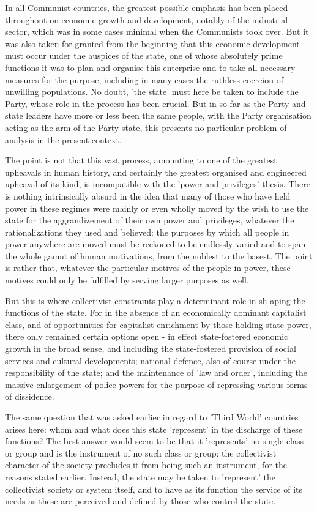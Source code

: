 In all Communist countries, the greatest possible emphasis has been placed throughout on economic growth and development, notably of the industrial sector, which was in some cases minimal when the Communists took over. But it was also taken for granted from the beginning that this economic development must occur under the auspices of the state, one of whose absolutely prime functions it was to plan and organise this enterprise and to take all necessary measures for the purpose, including in many cases the ruthless coercion of unwilling populations. No doubt, 'the state' must here be taken to include the Party, whose role in the process has been crucial. But in so far as the Party and state leaders have more or less been the same people, with the Party organisation acting as the arm of the Party-state, this presents no particular problem of analysis in the present context.

The point is not that this vast process, amounting to one of the greatest upheavals in human history, and certainly the greatest organised and engineered upheaval of its kind, is incompatible with the 'power and privileges' thesis. There is nothing intrinsically absurd in the idea that many of those who have held power in these regimes were mainly or even wholly moved by the wish to use the state for the aggrandizement of their own power and privileges, whatever the rationalizations they used and believed: the purposes by which all people in power anywhere are moved must be reckoned to be endlessly varied and to span the whole gamut of human motivations, from the noblest to the basest. The point is rather that, whatever the particular motives of the people in power, these motives could only be fulfilled by serving larger purposes as well.

But this is where collectivist constraints play a determinant role in sh aping the functions of the state. For in the absence of an economically dominant capitalist class, and of opportunities for capitalist enrichment by those holding state power, there only remained certain options open - in effect state-fostered economic growth in the broad sense, and including the state\hyp{}fostered provision of social services and cultural developments; national defence, also of course under the responsibility of the state; and the maintenance of 'law and order', including the massive enlargement of police powers for the purpose of repressing various forms of dissidence.

The same question that was asked earlier in regard to 'Third World' countries arises here: whom and what does this state 'represent' in the discharge of these functions? The best answer would seem to be that it 'represents' no single class or group and is the instrument of no such class or group: the collectivist character of the society precludes it from being such an instrument, for the reasons stated earlier. Instead, the state may be taken to 'represent' the collectivist society or system itself, and to have as its function the service of its needs as these are perceived and defined by those who control the state.

